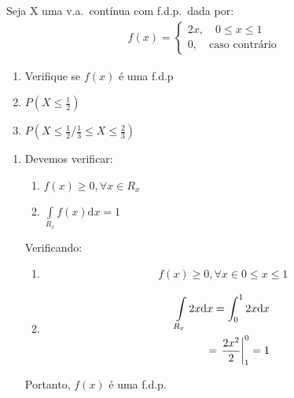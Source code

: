      \begin{example}Seja X uma v.a.\ contínua com f.d.p.\ dada por:
       \begin{align*}
         f(x)= 
         \begin{cases}
           2x,\quad 0\leq x \leq 1 \\ 
           0, \quad \text{caso contrário}
         \end{cases}
       \end{align*}
       \begin{enumerate}[label=(\alph*)]
         \item Verifique se $f(x)$ é uma f.d.p
         \item$ P \left( X\le \frac{1}{2}\right)$
         \item $P \left(X\le \frac{1}{2} / \frac{1}{3} \le X \le \frac{2}{3}\right)$
       \end{enumerate}
       \begin{enumerate}[label=(\alph*)]
         \item 
           Devemos verificar: 
           \begin{enumerate}[leftmargin=*, label=\roman*., widest=IV, align=left] %

             \item $f(x)\geq 0, \forall x \in R_{x}$

             \item $\int \limits_{R_{x}} f(x)\mathrm{d}x=1$
           \end{enumerate}
           Verificando:         
           \begin{enumerate}[leftmargin=*, label=\roman*., widest=IV, align=left]
             \item 
             \begin{align*}                 f(x)\geq 0, \forall x \in  0 \le x \le 1\end{align*}
             \item 
               \begin{align*}
                 \int \limits_{R_x} 2x \mathrm{d}x
                 =\int_{0}^1 2x \mathrm{d}x\\ 
                 = \left.\frac{2x^2}{2}\right\rvert_{1}^{0}= 1
               \end{align*}

           \end{enumerate}


           Portanto, $f(x)$ é uma f.d.p.\


\end{enumerate}
\end{example}
